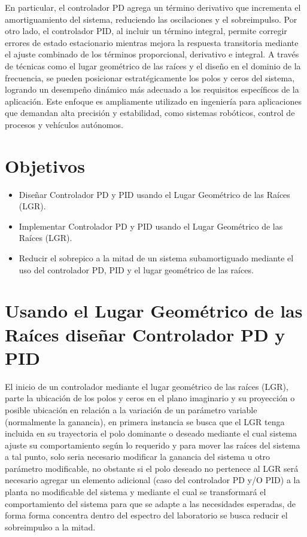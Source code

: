 \documentclass[conference]{IEEEtran}
\begin{document}
		En particular, el controlador PD agrega un término derivativo que incrementa el amortiguamiento del sistema, reduciendo las oscilaciones y el sobreimpulso. Por otro lado, el controlador PID, al incluir un término integral, permite corregir errores de estado estacionario mientras mejora la respuesta transitoria mediante el ajuste combinado de los términos proporcional, derivativo e integral. A través de técnicas como el lugar geométrico de las raíces y el diseño en el dominio de la frecuencia, se pueden posicionar estratégicamente los polos y ceros del sistema, logrando un desempeño dinámico más adecuado a los requisitos específicos de la aplicación. Este enfoque es ampliamente utilizado en ingeniería para aplicaciones que demandan alta precisión y estabilidad, como sistemas robóticos, control de procesos y vehículos autónomos.
	\section{Objetivos}
	
	\begin{itemize}
		\item Diseñar Controlador PD y PID usando el Lugar Geométrico de las Raíces (LGR).
		\item Implementar Controlador PD y PID usando el Lugar Geométrico de las Raíces (LGR).
		\item Reducir el sobrepico a la mitad de un sistema subamortiguado mediante el uso del controlador PD, PID y el lugar geométrico de las raíces.
	\end{itemize}
	
	\section{Usando el Lugar Geométrico de las Raíces diseñar Controlador PD y PID}
	
	El inicio de un controlador mediante el lugar geométrico de las raíces (LGR), parte la ubicación de los polos y ceros en el plano imaginario y su proyección o posible ubicación en relación a la variación de un parámetro variable (normalmente la ganancia), en primera instancia se busca que el LGR tenga incluida en su trayectoria el polo dominante o deseado mediante el cual sistema ajuste su comportamiento según lo requerido y para mover las raíces del sistema a tal punto, solo seria necesario modificar la ganancia del sistema u otro parámetro modificable, no obstante si el polo deseado no pertenece al LGR será necesario agregar un elemento adicional (caso del controlador PD y/O PID) a la planta no modificable del sistema y mediante el cual se transformará el comportamiento del sistema para que se adapte a las necesidades esperadas, de forma forma concentra dentro del espectro del laboratorio se busca reducir el sobreimpulso a la mitad.
	
\end{document}
